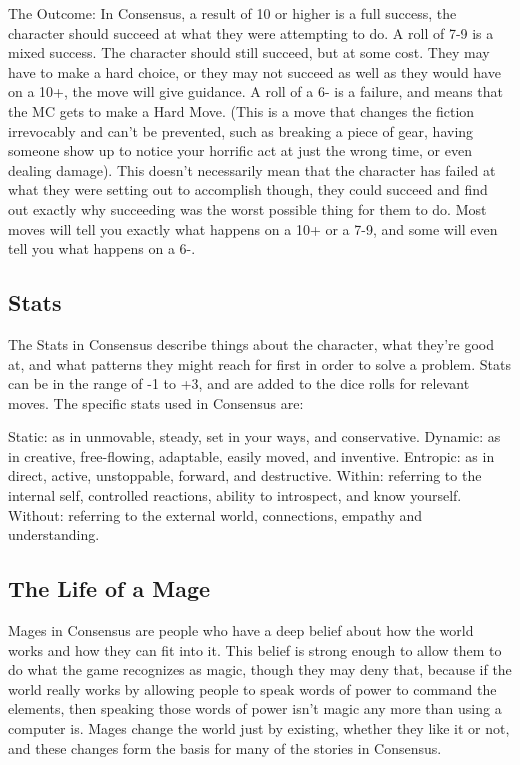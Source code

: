 \documentclass[
]{article}
\begin{document}
The Outcome: In Consensus, a result of 10 or higher is a full success,
the character should succeed at what they were attempting to do. A roll
of 7-9 is a mixed success. The character should still succeed, but at
some cost. They may have to make a hard choice, or they may not succeed
as well as they would have on a 10+, the move will give guidance. A roll
of a 6- is a failure, and means that the MC gets to make a Hard Move.
(This is a move that changes the fiction irrevocably and can't be
prevented, such as breaking a piece of gear, having someone show up to
notice your horrific act at just the wrong time, or even dealing
damage). This doesn't necessarily mean that the character has failed at
what they were setting out to accomplish though, they could succeed and
find out exactly why succeeding was the worst possible thing for them to
do. Most moves will tell you exactly what happens on a 10+ or a 7-9, and
some will even tell you what happens on a 6-.

\hypertarget{stats}{%
\subsection{Stats}\label{stats}}

The Stats in Consensus describe things about the character, what they're
good at, and what patterns they might reach for first in order to solve
a problem. Stats can be in the range of -1 to +3, and are added to the
dice rolls for relevant moves. The specific stats used in Consensus are:

Static: as in unmovable, steady, set in your ways, and conservative.
Dynamic: as in creative, free-flowing, adaptable, easily moved, and
inventive. Entropic: as in direct, active, unstoppable, forward, and
destructive. Within: referring to the internal self, controlled
reactions, ability to introspect, and know yourself. Without: referring
to the external world, connections, empathy and understanding.

\hypertarget{the-life-of-a-mage}{%
\subsection{The Life of a Mage}\label{the-life-of-a-mage}}

Mages in Consensus are people who have a deep belief about how the world
works and how they can fit into it. This belief is strong enough to
allow them to do what the game recognizes as magic, though they may deny
that, because if the world really works by allowing people to speak
words of power to command the elements, then speaking those words of
power isn't magic any more than using a computer is. Mages change the
world just by existing, whether they like it or not, and these changes
form the basis for many of the stories in Consensus.
\end{document}
